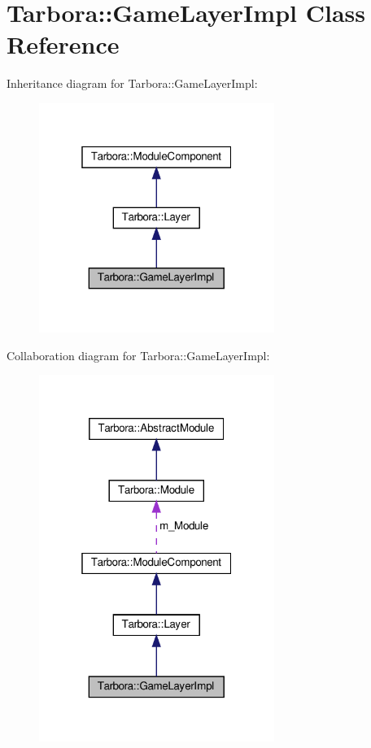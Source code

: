 \hypertarget{classTarbora_1_1GameLayerImpl}{}\section{Tarbora\+:\+:Game\+Layer\+Impl Class Reference}
\label{classTarbora_1_1GameLayerImpl}


Inheritance diagram for Tarbora\+:\+:Game\+Layer\+Impl\+:
\nopagebreak
\begin{figure}[H]
\begin{center}
\leavevmode
\includegraphics[width=217pt]{classTarbora_1_1GameLayerImpl__inherit__graph}
\end{center}
\end{figure}


Collaboration diagram for Tarbora\+:\+:Game\+Layer\+Impl\+:
\nopagebreak
\begin{figure}[H]
\begin{center}
\leavevmode
\includegraphics[width=217pt]{classTarbora_1_1GameLayerImpl__coll__graph}
\end{center}
\end{figure}
